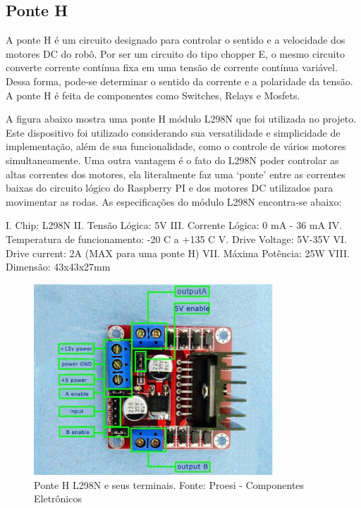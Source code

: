 \subsection{Ponte H}

A ponte H é um circuito designado para controlar o sentido e a velocidade dos motores DC do robô. Por ser um circuito do tipo chopper E, o mesmo circuito converte corrente contínua fixa em uma tensão de corrente contínua variável. Dessa forma, pode-se determinar o sentido da corrente e a polaridade da tensão. A ponte H é feita de componentes como Switches, Relays e Mosfets.

A figura abaixo mostra uma ponte H módulo L298N que foi utilizada no projeto. Este dispositivo foi utilizado considerando sua versatilidade e simplicidade de implementação, além de sua funcionalidade, como o controle de vários motores simultaneamente. Uma outra vantagem é o fato do L298N poder controlar as altas correntes dos motores, ela literalmente faz uma ‘ponte’ entre as correntes baixas do circuito lógico do Raspberry PI e dos motores DC utilizados para movimentar as rodas. As especificações do módulo L298N encontra-se abaixo:

I.	Chip: L298N
II.	Tensão Lógica: 5V
III.	Corrente Lógica: 0 mA - 36 mA
IV.	Temperatura de funcionamento: -20 C a +135 C
V.	Drive Voltage: 5V-35V
VI.	Drive current: 2A (MAX para uma ponte H)
VII.	Máxima Potência: 25W
VIII.	Dimensão: 43x43x27mm

\begin{figure}[H]
    \centering
    \includegraphics[width=0.8\textwidth]{figuras/ponteH.eps}
    \caption{Ponte H L298N e seus terminais. Fonte: Proesi - Componentes Eletrônicos}
    \label{fig:catia01}
\end{figure}

